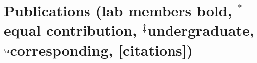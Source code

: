 \begin{itemize}

\end{itemize}


\section*{Publications {\small(lab members bold, $^*$equal contribution, $^\ddagger$undergraduate, $^\S$corresponding, [citations])}}


